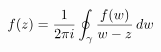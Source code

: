 \documentclass[preview]{standalone}
\begin{document}
\begin{align*}
\special{dvisvgm:raw <g id='unique000'>}f(z) = \frac{1}{2\pi i} \oint_{\gamma} \frac{f(w)}{w - z}\, dw\special{dvisvgm:raw </g>}
\end{align*}
\end{document}

